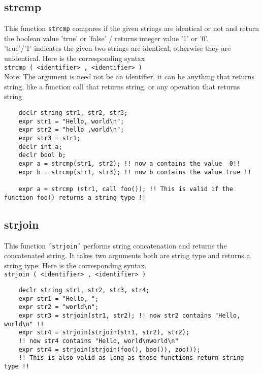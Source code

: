 \documentclass[journal, 18pt]{report}
\begin{document}
\subsection{strcmp}
This function \texttt{strcmp} compares if the given strings are identical or not and return the boolean value 'true' or 'false' / returns integer value '1' or '0'. \\
'true'/'1' indicates the given two strings are identical, otherwise they are unidentical. Here is the corresponding syntax\\
\texttt{strcmp ( <identifier> , <identifier> )} \\
Note: The argument is need not be an identifier, it can be anything that returns string, like a function call that returns string, or any operation that returns string
\begin{lstlisting}
    declr string str1, str2, str3;
    expr str1 = "Hello, world\n";
    expr str2 = "hello ,world\n";
    expr str3 = str1;
    declr int a;
    declr bool b;
    expr a = strcmp(str1, str2); !! now a contains the value  0!!
    expr b = strcmp(str1, str3); !! now b contains the value true !!

    expr a = strcmp (str1, call foo()); !! This is valid if the function foo() returns a string type !!
\end{lstlisting}

\subsection{strjoin}
This function \texttt{'strjoin'} performs string concatenation and returns the concatenated string. It takes two arguments both are string type and returns a string type. Here is the corresponding syntax.\\
\texttt{strjoin ( <identifier> , <identifier> )}
\begin{lstlisting}
    declr string str1, str2, str3, str4;
    expr str1 = "Hello, ";
    expr str2 = "world\n";
    expr str3 = strjoin(str1, str2); !! now str2 contains "Hello, world\n" !!
    expr str4 = strjoin(strjoin(str1, str2), str2); 
    !! now str4 contains "Hello, world\nworld\n"
    expr str4 = strjoin(strjoin(foo(), boo()), zoo()); 
    !! This is also valid as long as those functions return string type !!
\end{lstlisting}
\end{document}
